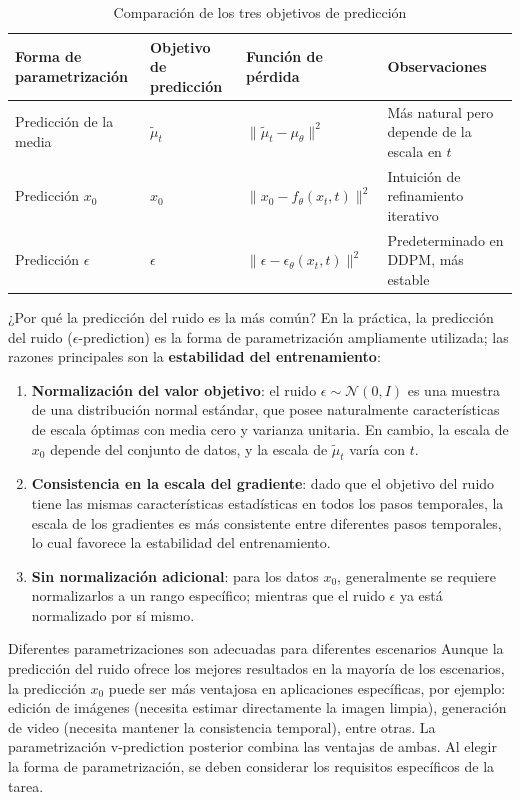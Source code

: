 \begin{table}[H]
\centering
\caption{Comparación de los tres objetivos de predicción}
\begin{tabular}{llll}
\toprule
\textbf{Forma de parametrización} & \textbf{Objetivo de predicción} & \textbf{Función de pérdida} & \textbf{Observaciones} \\
\midrule
Predicción de la media & $\tilde{\mu}_t$ & $\|\tilde{\mu}_t - \mu_\theta\|^2$ & Más natural pero depende de la escala en $t$ \\
Predicción $x_0$ & $x_0$ & $\|x_0 - f_\theta(x_t,t)\|^2$ & Intuición de refinamiento iterativo \\
Predicción $\epsilon$ & $\epsilon$ & $\|\epsilon - \epsilon_\theta(x_t,t)\|^2$ & Predeterminado en DDPM, más estable \\
\bottomrule
\end{tabular}
\end{table}

\begin{importantbox}{¿Por qué la predicción del ruido es la más común?}
En la práctica, la predicción del ruido ($\epsilon$-prediction) es la forma de parametrización ampliamente utilizada; las razones principales son la \textbf{estabilidad del entrenamiento}:
\begin{enumerate}
    \item \textbf{Normalización del valor objetivo}: el ruido $\epsilon \sim \mathcal{N}(0,I)$ es una muestra de una distribución normal estándar, que posee naturalmente características de escala óptimas con media cero y varianza unitaria. En cambio, la escala de $x_0$ depende del conjunto de datos, y la escala de $\tilde{\mu}_t$ varía con $t$.
    \item \textbf{Consistencia en la escala del gradiente}: dado que el objetivo del ruido tiene las mismas características estadísticas en todos los pasos temporales, la escala de los gradientes es más consistente entre diferentes pasos temporales, lo cual favorece la estabilidad del entrenamiento.
    \item \textbf{Sin normalización adicional}: para los datos $x_0$, generalmente se requiere normalizarlos a un rango específico; mientras que el ruido $\epsilon$ ya está normalizado por sí mismo.
\end{enumerate}
\end{importantbox}

\begin{warningbox}{Diferentes parametrizaciones son adecuadas para diferentes escenarios}
Aunque la predicción del ruido ofrece los mejores resultados en la mayoría de los escenarios, la predicción $x_0$ puede ser más ventajosa en aplicaciones específicas, por ejemplo: edición de imágenes (necesita estimar directamente la imagen limpia), generación de video (necesita mantener la consistencia temporal), entre otras. La parametrización v-prediction posterior combina las ventajas de ambas. Al elegir la forma de parametrización, se deben considerar los requisitos específicos de la tarea.
\end{warningbox}

